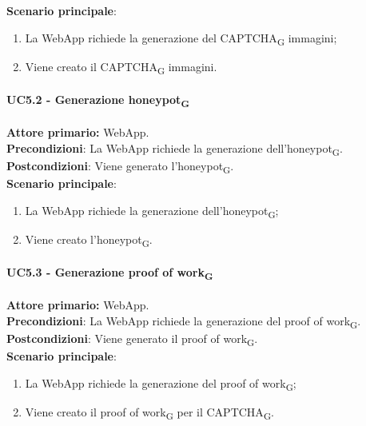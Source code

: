 \textbf{Scenario principale}:
\begin{enumerate}
    \item La WebApp richiede la generazione del CAPTCHA\textsubscript{G} immagini;
    \item Viene creato il CAPTCHA\textsubscript{G} immagini.
\end{enumerate}

\paragraph{UC5.2  - Generazione honeypot\textsubscript{G}}
\textbf{Attore primario:} WebApp.\\
\textbf{Precondizioni}: La WebApp richiede la generazione dell'honeypot\textsubscript{G}.\\
\textbf{Postcondizioni}: Viene generato l'honeypot\textsubscript{G}.\\

\textbf{Scenario principale}:
\begin{enumerate}
    \item La WebApp richiede la generazione dell'honeypot\textsubscript{G};
    \item Viene creato l'honeypot\textsubscript{G}.
\end{enumerate}

\paragraph{UC5.3  - Generazione proof of work\textsubscript{G}}
\textbf{Attore primario:} WebApp.\\
\textbf{Precondizioni}: La WebApp richiede la generazione del proof of work\textsubscript{G}.\\
\textbf{Postcondizioni}: Viene generato il proof of work\textsubscript{G}.\\

\textbf{Scenario principale}:
\begin{enumerate}
    \item La WebApp richiede la generazione del proof of work\textsubscript{G};
    \item Viene creato il proof of work\textsubscript{G} per il CAPTCHA\textsubscript{G}.
\end{enumerate}

